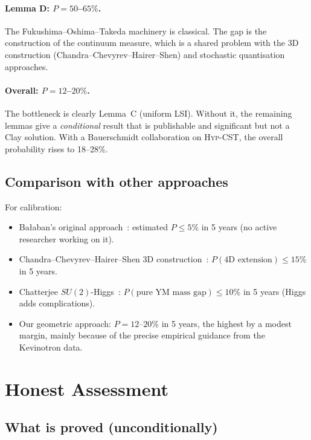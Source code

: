 \documentclass[11pt,a4paper]{amsart}
\theoremstyle{definition}
\theoremstyle{remark}
\begin{document}
\paragraph{Lemma D: $P = 50$--$65\%$.}
The Fukushima--Oshima--Takeda machinery is classical. The gap is the
construction of the continuum measure, which is a shared problem with the
3D construction (Chandra--Chevyrev--Hairer--Shen) and stochastic
quantisation approaches.

\paragraph{Overall: $P = 12$--$20\%$.}
The bottleneck is clearly Lemma~C (uniform LSI). Without it, the
remaining lemmas give a \emph{conditional} result that is publishable and
significant but not a Clay solution. With a Bauerschmidt collaboration on
\textsc{Hyp-CST}, the overall probability rises to 18--28\%.

\subsection{Comparison with other approaches}

For calibration:
\begin{itemize}[leftmargin=2em]
\item Ba\l aban's original approach~\cite{Balaban1985}: estimated $P \leq 5\%$
      in 5 years (no active researcher working on it).
\item Chandra--Chevyrev--Hairer--Shen 3D construction~\cite{CCHS2024}:
      $P(\text{4D extension}) \leq 15\%$ in 5 years.
\item Chatterjee $SU(2)$-Higgs~\cite{Chatterjee2024}: $P(\text{pure YM mass gap})
      \leq 10\%$ in 5 years (Higgs adds complications).
\item Our geometric approach: $P = 12$--$20\%$ in 5 years, the highest
      by a modest margin, mainly because of the precise empirical guidance
      from the Kevinotron data.
\end{itemize}

\section{Honest Assessment}\label{sec:honest}

\subsection{What is proved (unconditionally)}
\end{document}
